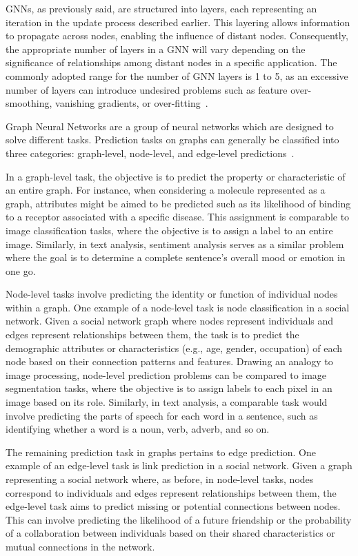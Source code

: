 GNNs, as previously said, are structured into layers, each representing an iteration in the update process described earlier.
This layering allows information to propagate across nodes, enabling the influence of distant nodes.
Consequently, the appropriate number of layers in a GNN will vary depending on the significance of relationships among distant nodes in a specific application.
The commonly adopted range for the number of GNN layers is 1 to 5, as an excessive number of layers can introduce undesired problems such as feature over-smoothing, vanishing gradients, or over-fitting~\cite{DBLP:journals/corr/abs-1801-07606}.

Graph Neural Networks are a group of neural networks which are designed to solve different tasks.
Prediction tasks on graphs can generally be classified into three categories: graph-level, node-level, and edge-level predictions~\cite{sanchez-lengeling2021a}.

In a graph-level task, the objective is to predict the property or characteristic of an entire graph.
For instance, when considering a molecule represented as a graph, attributes might be aimed to be predicted such as its likelihood of binding to a receptor associated with a specific disease.
This assignment is comparable to image classification tasks, where the objective is to assign a label to an entire image.
Similarly, in text analysis, sentiment analysis serves as a similar problem where the goal is to determine a complete sentence's overall mood or emotion in one go.

Node-level tasks involve predicting the identity or function of individual nodes within a graph.
One example of a node-level task is node classification in a social network.
Given a social network graph where nodes represent individuals and edges represent relationships between them, the task is to predict the demographic attributes or characteristics (e.g., age, gender, occupation) of each node based on their connection patterns and features.
Drawing an analogy to image processing, node-level prediction problems can be compared to image segmentation tasks, where the objective is to assign labels to each pixel in an image based on its role.
Similarly, in text analysis, a comparable task would involve predicting the parts of speech for each word in a sentence, such as identifying whether a word is a noun, verb, adverb, and so on.


The remaining prediction task in graphs pertains to edge prediction.
One example of an edge-level task is link prediction in a social network.
Given a graph representing a social network where, as before, in node-level tasks, nodes correspond to individuals and edges represent relationships between them, the edge-level task aims to predict missing or potential connections between nodes.
This can involve predicting the likelihood of a future friendship or the probability of a collaboration between individuals based on their shared characteristics or mutual connections in the network.

